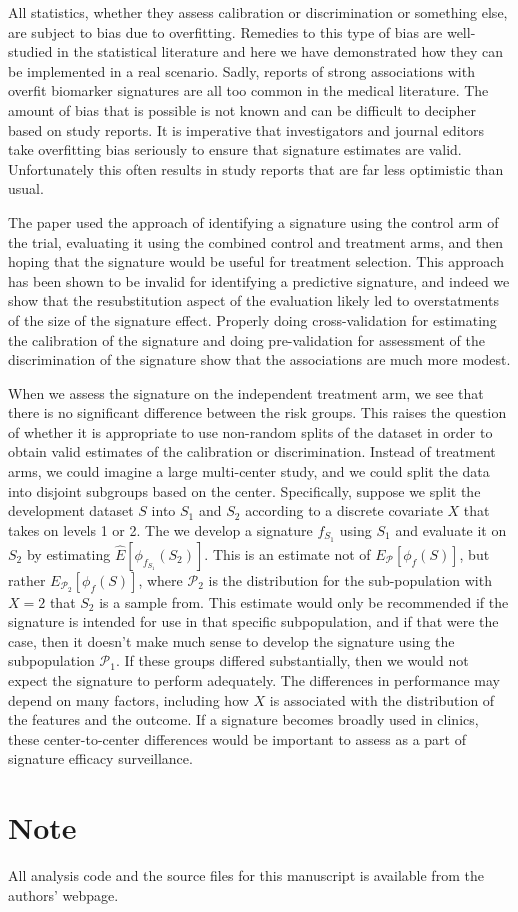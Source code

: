 \documentclass[12pt,]{article}
\begin{document}
All statistics, whether they assess calibration or discrimination or
something else, are subject to bias due to overfitting. Remedies to this
type of bias are well-studied in the statistical literature and here we
have demonstrated how they can be implemented in a real scenario. Sadly,
reports of strong associations with overfit biomarker signatures are all
too common in the medical literature. The amount of bias that is
possible is not known and can be difficult to decipher based on study
reports. It is imperative that investigators and journal editors take
overfitting bias seriously to ensure that signature estimates are valid.
Unfortunately this often results in study reports that are far less
optimistic than usual.

The \citet{zhu2010prognostic} paper used the approach of identifying a
signature using the control arm of the trial, evaluating it using the
combined control and treatment arms, and then hoping that the signature
would be useful for treatment selection. This approach has been shown to
be invalid \citep{simon2011re} for identifying a predictive signature,
and indeed we show that the resubstitution aspect of the evaluation
likely led to overstatments of the size of the signature effect.
Properly doing cross-validation for estimating the calibration of the
signature and doing pre-validation for assessment of the discrimination
of the signature show that the associations are much more modest.

When we assess the signature on the independent treatment arm, we see
that there is no significant difference between the risk groups. This
raises the question of whether it is appropriate to use non-random
splits of the dataset in order to obtain valid estimates of the
calibration or discrimination. Instead of treatment arms, we could
imagine a large multi-center study, and we could split the data into
disjoint subgroups based on the center. Specifically, suppose we split
the development dataset \(S\) into \(S_1\) and \(S_2\) according to a
discrete covariate \(X\) that takes on levels 1 or 2. The we develop a
signature \(f_{S_1}\) using \(S_1\) and evaluate it on \(S_2\) by
estimating \(\hat{E}[\phi_{f_{S_1}}(S_2)]\). This is an estimate not of
\(E_\mathcal{P}[\phi_f(S)]\), but rather
\(E_{\mathcal{P}_2}[\phi_f(S)]\), where \(\mathcal{P}_2\) is the
distribution for the sub-population with \(X = 2\) that \(S_2\) is a
sample from. This estimate would only be recommended if the signature is
intended for use in that specific subpopulation, and if that were the
case, then it doesn't make much sense to develop the signature using the
subpopulation \(\mathcal{P}_1\). If these groups differed substantially,
then we would not expect the signature to perform adequately. The
differences in performance may depend on many factors, including how
\(X\) is associated with the distribution of the features and the
outcome. If a signature becomes broadly used in clinics, these
center-to-center differences would be important to assess as a part of
signature efficacy surveillance.

\section{Note}\label{note}

All analysis code and the source files for this manuscript is available
from the authors' webpage.

\renewcommand\refname{References}

\end{document}
